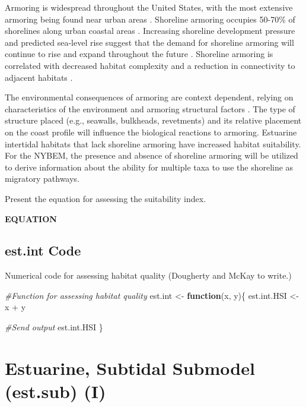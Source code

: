 \documentclass[
]{book}
\newenvironment{Shaded}{\begin{snugshade}}{\end{snugshade}}
\newcommand{\CommentTok}[1]{\textcolor[rgb]{0.56,0.35,0.01}{\textit{#1}}}
\newcommand{\ControlFlowTok}[1]{\textcolor[rgb]{0.13,0.29,0.53}{\textbf{#1}}}
\newcommand{\NormalTok}[1]{#1}
\newcommand{\OtherTok}[1]{\textcolor[rgb]{0.56,0.35,0.01}{#1}}
\newcommand{\SpecialCharTok}[1]{\textcolor[rgb]{0.00,0.00,0.00}{#1}}
\begin{document}
Armoring is widespread throughout the United States, with the most extensive armoring being found near urban areas \citep{morley_ecological_2012}. Shoreline armoring occupies 50-70\% of shorelines along urban coastal areas \citep{dugan_generalizing_2018}. Increasing shoreline development pressure and predicted sea-level rise suggest that the demand for shoreline armoring will continue to rise and expand throughout the future \citep{gardner_is_2021}. Shoreline armoring is correlated with decreased habitat complexity and a reduction in connectivity to adjacent habitats \citep{morley_ecological_2012}.

The environmental consequences of armoring are context dependent, relying on characteristics of the environment and armoring structural factors \citep{dugan_generalizing_2018}. The type of structure placed (e.g., seawalls, bulkheads, revetments) and its relative placement on the coast profile will influence the biological reactions to armoring. Estuarine intertidal habitats that lack shoreline armoring have increased habitat suitability. For the NYBEM, the presence and absence of shoreline armoring will be utilized to derive information about the ability for multiple taxa to use the shoreline as migratory pathways.

Present the equation for assessing the suitability index.

\textbf{EQUATION}

\hypertarget{est.int-code}{%
\subsection{est.int Code}\label{est.int-code}}

Numerical code for assessing habitat quality ({Dougherty and McKay to write.})

\begin{Shaded}
\begin{Highlighting}[]
\CommentTok{\#Function for assessing habitat quality}
\NormalTok{est.int }\OtherTok{\textless{}{-}} \ControlFlowTok{function}\NormalTok{(x, y)\{}
\NormalTok{  est.int.HSI }\OtherTok{\textless{}{-}}\NormalTok{ x }\SpecialCharTok{+}\NormalTok{ y}

  \CommentTok{\#Send output}
\NormalTok{  est.int.HSI}
\NormalTok{\}}
\end{Highlighting}
\end{Shaded}

\hypertarget{estuarine-subtidal-submodel-est.sub-i}{%
\section{Estuarine, Subtidal Submodel (est.sub) (I)}\label{estuarine-subtidal-submodel-est.sub-i}}
\end{document}
